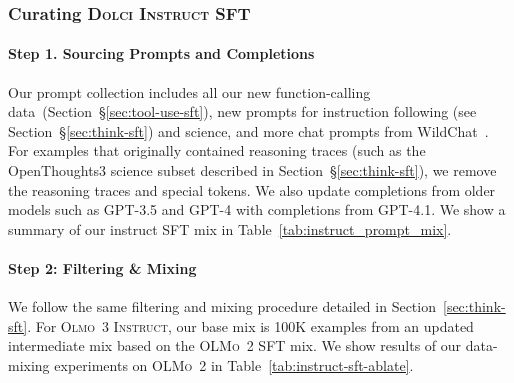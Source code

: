 \documentclass[table]{ai2style/ai2}
\newcommand{\oldOlmo}{OLMo\xspace}
\newcommand{\newOlmo}{Olmo\xspace}
\newcommand{\olmotoo}{\textsc{\oldOlmo~2}\xspace}
\newcommand{\olmothreeinstruct}{\textsc{\newOlmo~3 Instruct}\xspace}
\newcommand{\dolciinstructsft}{\textsc{Dolci Instruct SFT}\xspace}
\begin{document}
{{\subsubsection{Curating \dolciinstructsft}
\paragraph{Step 1. Sourcing Prompts and Completions}

Our prompt collection includes all our new function-calling data~(Section~\S\ref{sec:tool-use-sft}), new prompts for instruction following (see Section~\S\ref{sec:think-sft}) and science, and more chat prompts from WildChat~\citep{zhao2024wildchat}. For examples that originally contained reasoning traces (such as the OpenThoughts3 science subset described in Section~\S\ref{sec:think-sft}), we remove the reasoning traces and special tokens. We also update completions from older models such as GPT-3.5 and GPT-4 with completions from GPT-4.1. We show a summary of our instruct SFT mix in Table~\ref{tab:instruct_prompt_mix}.

\paragraph{Step 2: Filtering \& Mixing}

We follow the same filtering and mixing procedure detailed in Section~\ref{sec:think-sft}. For \olmothreeinstruct, our base mix is 100K examples from an updated intermediate mix based on the \olmotoo SFT mix. We show results of our data-mixing experiments on \olmotoo in Table~\ref{tab:instruct-sft-ablate}.

}}
\end{document}
